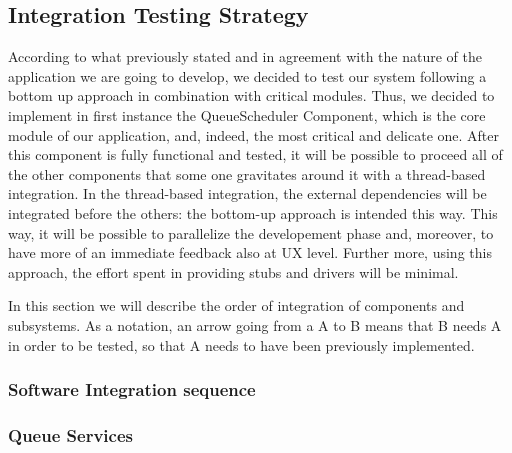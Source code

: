  \subsection{Integration Testing Strategy}
\label{subsect:integrationtestingstrategy}
According to what previously stated and in agreement with the nature of the application we are going to develop, we decided to test our system following a bottom up approach in combination with critical modules.\newline
Thus, we decided to implement in first instance the QueueScheduler Component, which is the core module of our application, and, indeed, the most critical and delicate one. After this component is fully functional and tested, it will be possible to proceed all of the other components that some one gravitates around it with a thread-based integration. In the thread-based integration, the external dependencies will be integrated before the others: the bottom-up approach is intended this way.\newline
This way, it will be possible to parallelize the developement phase and, moreover, to have more of an immediate feedback also at UX level. Further more, using this approach, the effort spent in providing stubs and drivers will be minimal.

In this section we will describe the order of integration of components and subsystems.
As a notation, an arrow going from a A to B means that B needs A in order to be tested, so that A needs to have been previously implemented.

\subsubsection{Software Integration sequence}
\label{subsect: softwareintegrationsequence}

\subsubsection*{Queue Services}


